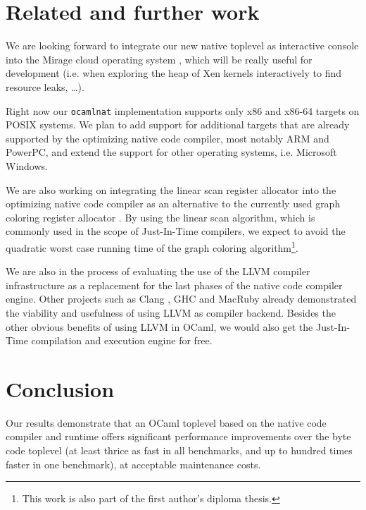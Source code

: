\documentclass[10pt,a4paper,draft,twocolumn]{article}
\makeatletter
\newcommand{\ie}{i.e.\@\xspace}
\makeatother
\begin{document}
\section{Related and further work} \label{section:Related_and_further_work}

We are looking forward to integrate our new native toplevel as interactive console
into the Mirage cloud operating system \cite{Mirage11,Madhavapeddy10,Madhavapeddy10hotcloud}, which
will be really useful for development (\ie when exploring the heap of Xen kernels interactively to
find resource leaks, \ldots).

Right now our \texttt{ocamlnat} implementation supports only x86 and x86-64 targets on POSIX systems.
We plan to add support for additional targets that are already supported by the optimizing native
code compiler, most notably ARM and PowerPC, and extend the support for other operating systems,
\ie Microsoft Windows.

We are also working on integrating the linear scan register allocator \cite{PolettoS99,WimmerM05}
into the optimizing native code compiler as an alternative to the currently used graph coloring
register allocator \cite{Aho06}. By using the linear scan algorithm, which is commonly used in the
scope of Just-In-Time compilers, we expect to avoid the quadratic worst case running time of the
graph coloring algorithm\footnote{This work is also part of the first author's diploma thesis.}.

We are also in the process of evaluating the use of the LLVM compiler infrastructure
\cite{Lattner02,Lattner04,LLVM11} as a replacement
for the last phases of the native code compiler engine. Other projects such as Clang \cite{Clang11},
GHC \cite{Terei10} and MacRuby \cite{MacRuby11} already demonstrated the viability and usefulness of
using LLVM as compiler backend. Besides the other obvious benefits of using LLVM in OCaml, we would
also get the Just-In-Time compilation and execution engine for free.


\section{Conclusion} \label{section:Conclusion}

Our results demonstrate that an OCaml toplevel based on the native code compiler and runtime offers
significant performance improvements over the byte code toplevel (at least thrice as fast in all
benchmarks, and up to hundred times faster in one benchmark), at acceptable maintenance costs.
\end{document}
